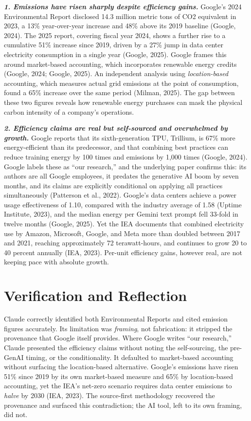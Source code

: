 \documentclass[11pt, twocolumn]{article}
\begin{document}
\textbf{\textit{1. Emissions have risen sharply despite efficiency gains.}}
Google's 2024 Environmental Report disclosed 14.3 million metric tons of CO2 equivalent in 2023, a 13\% year-over-year increase and 48\% above its 2019 baseline (Google, 2024). The 2025 report, covering fiscal year 2024, shows a further rise to a cumulative 51\% increase since 2019, driven by a 27\% jump in data center electricity consumption in a single year (Google, 2025). Google frames this around market-based accounting, which incorporates renewable energy credits (Google, 2024; Google, 2025). An independent analysis using \textit{location-based} accounting, which measures actual grid emissions at the point of consumption, found a 65\% increase over the same period (Milman, 2025). The gap between these two figures reveals how renewable energy purchases can mask the physical carbon intensity of a company's operations.

\textbf{\textit{2. Efficiency claims are real but self-sourced and overwhelmed by growth.}}
Google reports that its sixth-generation TPU, Trillium, is 67\% more energy-efficient than its predecessor, and that combining best practices can reduce training energy by 100 times and emissions by 1,000 times (Google, 2024). Google labels these as ``our research,'' and the underlying paper confirms this: its authors are all Google employees, it predates the generative AI boom by seven months, and its claims are explicitly conditional on applying all practices simultaneously (Patterson et al., 2022). Google's data centers achieve a power usage effectiveness of 1.10, compared with the industry average of 1.58 (Uptime Institute, 2023), and the median energy per Gemini text prompt fell 33-fold in twelve months (Google, 2025). Yet the IEA documents that combined electricity use by Amazon, Microsoft, Google, and Meta more than doubled between 2017 and 2021, reaching approximately 72 terawatt-hours, and continues to grow 20 to 40 percent annually (IEA, 2023). Per-unit efficiency gains, however real, are not keeping pace with absolute growth.

\section*{Verification and Reflection}
Claude correctly identified both Environmental Reports and cited emission figures accurately. Its limitation was \textit{framing}, not fabrication: it stripped the provenance that Google itself provides. Where Google writes ``our research,'' Claude presented the efficiency claims without noting the self-sourcing, the pre-GenAI timing, or the conditionality. It defaulted to market-based accounting without surfacing the location-based alternative. Google's emissions have risen 51\% since 2019 by its own market-based measure and 65\% by location-based accounting, yet the IEA's net-zero scenario requires data center emissions to \textit{halve} by 2030 (IEA, 2023). The source-first methodology recovered the provenance and surfaced this contradiction; the AI tool, left to its own framing, did not.
\end{document}
